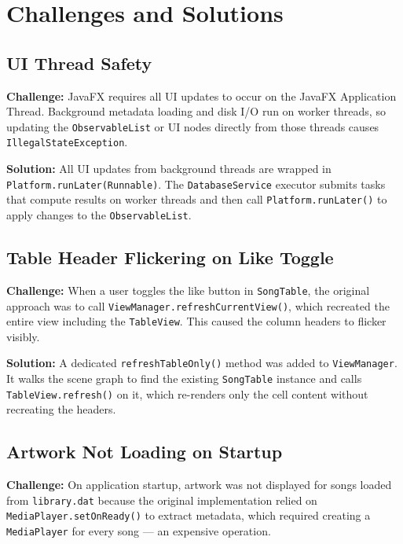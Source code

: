 ﻿\documentclass[12pt]{report}
\begin{document}
\newpage
\chapter{Challenges and Solutions}

\section{UI Thread Safety}
\textbf{Challenge:} JavaFX requires all UI updates to occur on the JavaFX Application Thread. Background metadata loading and disk I/O run on worker threads, so updating the \texttt{ObservableList} or UI nodes directly from those threads causes \texttt{IllegalStateException}.

\textbf{Solution:} All UI updates from background threads are wrapped in \texttt{Platform.runLater(Runnable)}. The \texttt{DatabaseService} executor submits tasks that compute results on worker threads and then call \texttt{Platform.runLater()} to apply changes to the \texttt{ObservableList}.

\section{Table Header Flickering on Like Toggle}
\textbf{Challenge:} When a user toggles the like button in \texttt{SongTable}, the original approach was to call \texttt{ViewManager.refreshCurrentView()}, which recreated the entire view including the \texttt{TableView}. This caused the column headers to flicker visibly.

\textbf{Solution:} A dedicated \texttt{refreshTableOnly()} method was added to \texttt{ViewManager}. It walks the scene graph to find the existing \texttt{SongTable} instance and calls \texttt{TableView.refresh()} on it, which re-renders only the cell content without recreating the headers.

\section{Artwork Not Loading on Startup}
\textbf{Challenge:} On application startup, artwork was not displayed for songs loaded from \texttt{library.dat} because the original implementation relied on \texttt{MediaPlayer.setOnReady()} to extract metadata, which required creating a \texttt{MediaPlayer} for every song --- an expensive operation.
\end{document}
